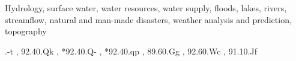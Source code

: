 \documentclass[preprint,review,12pt]{dependencies/elsarticle}
\begin{document}
\begin{frontmatter}
\begin{highlights}
\end{highlights}
%
%
%
\begin{keyword}
Hydrology, surface water, water resources, water supply, floods, lakes, rivers, streamflow, natural and man-made disasters, weather analysis and prediction, topography

.-t \sep %
92.40.Qk \sep %
*92.40.Q- \sep %
*92.40.qp \sep %
89.60.Gg \sep %
92.60.Wc \sep %
91.10.Jf      %
%
%
\end{keyword}
\end{frontmatter}
%
%
\linenumbers
%
\end{document}
